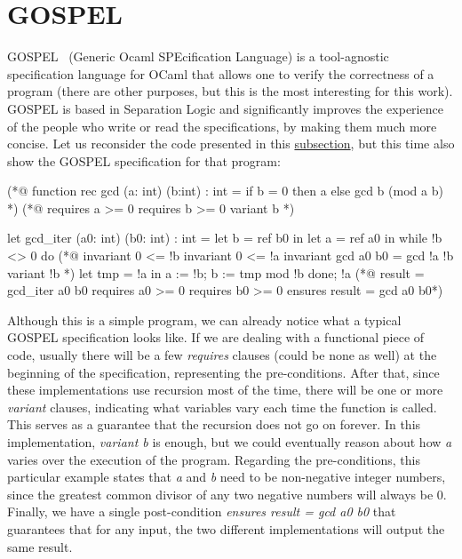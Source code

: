 \FloatBarrier
\section{GOSPEL}
\label{sec:gospel}

GOSPEL~\cite{DBLP:conf/fm/ChargueraudFLP19} (Generic Ocaml SPEcification Language) is a tool-agnostic specification language for OCaml that allows one to verify the correctness of a program (there are other purposes, but this is the most interesting for this work).
GOSPEL is based in Separation Logic and significantly improves the experience of the people who write or read the specifications, by making them much more concise.
Let us reconsider the code presented in this \hyperref[sub:examples_ocaml]{subsection}, but this time also show the GOSPEL specification for that program:

\begin{gospel}
  (*@ function rec gcd (a: int) (b:int) : int =
      if b = 0 then a
      else gcd b (mod a b) *)
  (*@ requires a >= 0
      requires b >= 0
      variant b *)
\end{gospel}

\begin{gospel}
  let gcd_iter (a0: int) (b0: int) : int =
    let b = ref b0 in
    let a = ref a0 in
    while !b <> 0 do
        (*@ invariant 0 <= !b
            invariant 0 <= !a
            invariant gcd a0 b0 = gcd !a !b
            variant !b *)
        let tmp = !a in
        a := !b;
        b := tmp mod !b
    done;
    !a
  (*@ result = gcd_iter a0 b0
      requires a0 >= 0
      requires b0 >= 0
      ensures result = gcd a0 b0*)
\end{gospel}

Although this is a simple program, we can already notice what a typical GOSPEL specification looks like.
If we are dealing with a functional piece of code, usually there will be a few \emph{requires} clauses (could be none as well) at the beginning of the specification, representing the pre-conditions.
After that, since these implementations use recursion most of the time, there will be one or more \emph{variant} clauses, indicating what variables vary each time the function is called.
This serves as a guarantee that the recursion does not go on forever.
In this implementation, \emph{variant b} is enough, but we could eventually reason about how \emph{a} varies over the execution of the program. 
Regarding the pre-conditions, this particular example states that \emph{a} and \emph{b} need to be non-negative integer numbers, since the greatest common divisor of any two negative numbers will always be 0.
Finally, we have a single post-condition \emph{ensures result = gcd a0 b0} that guarantees that for any input, the two different implementations will output the same result. 


